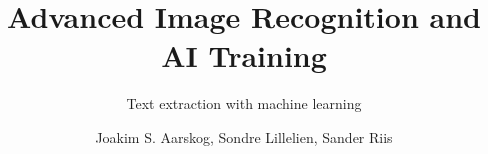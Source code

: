 \documentclass[
]{thesistemplate}
\affiliation{Østfold University College}
\title{Advanced Image Recognition and AI Training} %
\subtitle{Text extraction with machine learning}
\author{
    Joakim S. Aarskog,\+
    Sondre Lillelien,\+
    Sander Riis
}
\begin{document}
\maketitle          %
\frontmatter        %





\tableofcontents    %

\listoffigures      %

\mainmatter  %












\printglossaries            %

\appendix                   %
\end{document}
